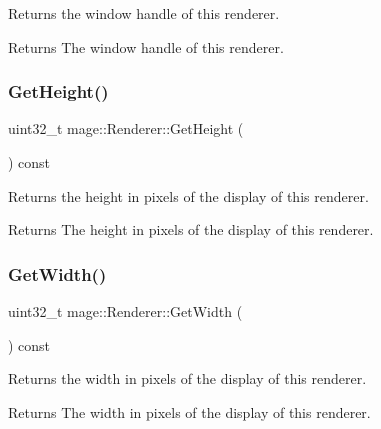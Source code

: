 Returns the window handle of this renderer.

\begin{DoxyReturn}{Returns}
The window handle of this renderer. 
\end{DoxyReturn}
\hypertarget{classmage_1_1_renderer_a40c90d8878416dd03b7fdef0b3de29a8}{}\label{classmage_1_1_renderer_a40c90d8878416dd03b7fdef0b3de29a8} 
\subsubsection{\texorpdfstring{Get\+Height()}{GetHeight()}}
{\footnotesize\ttfamily uint32\+\_\+t mage\+::\+Renderer\+::\+Get\+Height (\begin{DoxyParamCaption}{ }\end{DoxyParamCaption}) const}

Returns the height in pixels of the display of this renderer.

\begin{DoxyReturn}{Returns}
The height in pixels of the display of this renderer. 
\end{DoxyReturn}
\hypertarget{classmage_1_1_renderer_a65e448e5fa4e8b6be0371ff00b97912a}{}\label{classmage_1_1_renderer_a65e448e5fa4e8b6be0371ff00b97912a} 
\subsubsection{\texorpdfstring{Get\+Width()}{GetWidth()}}
{\footnotesize\ttfamily uint32\+\_\+t mage\+::\+Renderer\+::\+Get\+Width (\begin{DoxyParamCaption}{ }\end{DoxyParamCaption}) const}

Returns the width in pixels of the display of this renderer.

\begin{DoxyReturn}{Returns}
The width in pixels of the display of this renderer. 
\end{DoxyReturn}
\hypertarget{classmage_1_1_renderer_aafed50e7e14ca597541c091941351929}{}\label{classmage_1_1_renderer_aafed50e7e14ca597541c091941351929} 
